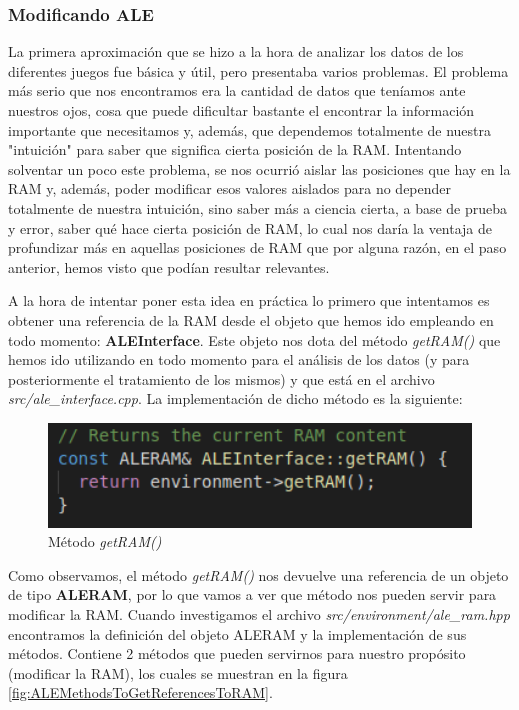 \subsubsection{Modificando ALE}
\label{subsubsec:ramanalisi:modale}

La primera aproximación que se hizo a la hora de analizar los datos de los diferentes juegos fue básica y útil, pero presentaba varios problemas. El problema más serio que nos encontramos era la cantidad de datos que teníamos ante nuestros ojos, cosa que puede dificultar bastante el encontrar la información importante que necesitamos y, además, que dependemos totalmente de nuestra "intuición" para saber que significa cierta posición de la RAM. Intentando solventar un poco este problema, se nos ocurrió aislar las posiciones que hay en la RAM y, además, poder modificar esos valores aislados para no depender totalmente de nuestra intuición, sino saber más a ciencia cierta, a base de prueba y error, saber qué hace cierta posición de RAM, lo cual nos daría la ventaja de profundizar más en aquellas posiciones de RAM que por alguna razón, en el paso anterior, hemos visto que podían resultar relevantes.

A la hora de intentar poner esta idea en práctica lo primero que intentamos es obtener una referencia de la RAM desde el objeto que hemos ido empleando en todo momento: \textbf{ALEInterface}. Este objeto nos dota del método \textit{getRAM()} que hemos ido utilizando en todo momento para el análisis de los datos (y para posteriormente el tratamiento de los mismos) y que está en el archivo \textit{src/ale\_interface.cpp}. La implementación de dicho método es la siguiente:

\begin{figure}[h]
	\centering
	\includegraphics[width=1\textwidth]{Figures/methodGetRAM}
	\caption{Método \textit{getRAM()}}
	\label{fig:methodGetRAM}
\end{figure}

Como observamos, el método \textit{getRAM()} nos devuelve una referencia de un objeto de tipo \textbf{ALERAM}, por lo que vamos a ver que método nos pueden servir para modificar la RAM. Cuando investigamos el archivo \textit{src/environment/ale\_ram.hpp} encontramos la definición del objeto ALERAM y la implementación de sus métodos. Contiene 2 métodos que pueden servirnos para nuestro propósito (modificar la RAM), los cuales se muestran en la figura \ref{fig:ALEMethodsToGetReferencesToRAM}.

